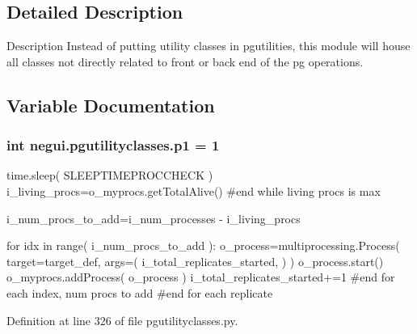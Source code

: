 \subsection{Detailed Description}
\begin{DoxyVerb}Description
Instead of putting utility classes in pgutilities,
this module will house all classes not directly related
to front or back end of the pg operations.
\end{DoxyVerb}
 

\subsection{Variable Documentation}
\subsubsection[{\texorpdfstring{p1}{p1}}]{\setlength{\rightskip}{0pt plus 5cm}int negui.\+pgutilityclasses.\+p1 = 1}\hypertarget{namespacenegui_1_1pgutilityclasses_af03bb9226272b714c1db572575aa8a71}{}\label{namespacenegui_1_1pgutilityclasses_af03bb9226272b714c1db572575aa8a71}


time.\+sleep( S\+L\+E\+E\+P\+T\+I\+M\+E\+P\+R\+O\+C\+C\+H\+E\+C\+K ) i\+\_\+living\+\_\+procs=o\+\_\+myprocs.\+get\+Total\+Alive() \#end while living procs is max 

i\+\_\+num\+\_\+procs\+\_\+to\+\_\+add=i\+\_\+num\+\_\+processes -\/ i\+\_\+living\+\_\+procs

for idx in range( i\+\_\+num\+\_\+procs\+\_\+to\+\_\+add )\+: o\+\_\+process=multiprocessing.\+Process( target=target\+\_\+def, args=( i\+\_\+total\+\_\+replicates\+\_\+started, ) ) o\+\_\+process.\+start() o\+\_\+myprocs.\+add\+Process( o\+\_\+process ) i\+\_\+total\+\_\+replicates\+\_\+started+=1 \#end for each index, num procs to add \#end for each replicate 

Definition at line 326 of file pgutilityclasses.\+py.

